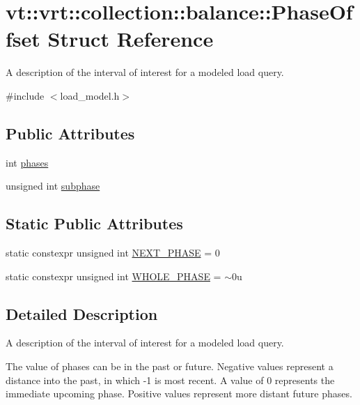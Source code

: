 \hypertarget{structvt_1_1vrt_1_1collection_1_1balance_1_1_phase_offset}{}\section{vt\+:\+:vrt\+:\+:collection\+:\+:balance\+:\+:Phase\+Offset Struct Reference}
\label{structvt_1_1vrt_1_1collection_1_1balance_1_1_phase_offset}


A description of the interval of interest for a modeled load query.  




{\ttfamily \#include $<$load\+\_\+model.\+h$>$}

\subsection*{Public Attributes}
\begin{DoxyCompactItemize}
\item 
int \hyperlink{structvt_1_1vrt_1_1collection_1_1balance_1_1_phase_offset_a8548a90b20b426e5986f20beb139d3d1}{phases}
\item 
unsigned int \hyperlink{structvt_1_1vrt_1_1collection_1_1balance_1_1_phase_offset_a61facb996e52cae3e9a8c9d4d3091ee0}{subphase}
\end{DoxyCompactItemize}
\subsection*{Static Public Attributes}
\begin{DoxyCompactItemize}
\item 
static constexpr unsigned int \hyperlink{structvt_1_1vrt_1_1collection_1_1balance_1_1_phase_offset_aa8a8c4379ab878392c4f65212e92f581}{N\+E\+X\+T\+\_\+\+P\+H\+A\+SE} = 0
\item 
static constexpr unsigned int \hyperlink{structvt_1_1vrt_1_1collection_1_1balance_1_1_phase_offset_a0eb2d2db9e2d4329e2f76332c1fb2429}{W\+H\+O\+L\+E\+\_\+\+P\+H\+A\+SE} = $\sim$0u
\end{DoxyCompactItemize}


\subsection{Detailed Description}
A description of the interval of interest for a modeled load query. 

The value of {\ttfamily phases} can be in the past or future. Negative values represent a distance into the past, in which -\/1 is most recent. A value of 0 represents the immediate upcoming phase. Positive values represent more distant future phases. 

